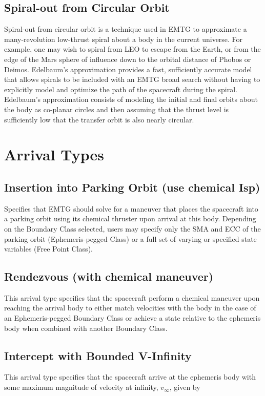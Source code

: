     \subsection{Spiral-out from Circular Orbit}
    \label{sec:spiral_out}
    Spiral-out from circular orbit is a technique used in \ac{EMTG} to approximate a many-revolution low-thrust spiral about a body in the current universe. For example, one may wish to spiral from \ac{LEO} to escape from the Earth, or from the edge of the Mars sphere of influence down to the orbital distance of Phobos or Deimos. Edelbaum's approximation provides a fast, sufficiently accurate model that allows spirals to be included with an \ac{EMTG} broad search without having to explicitly model and optimize the path of the spacecraft during the spiral. Edelbaum's approximation consists of modeling the initial and final orbits about the body as co-planar circles and then assuming that the thrust level is sufficiently low that the transfer orbit is also nearly circular.


\section{Arrival Types}
\label{sec:arrival_boundaries}

    \subsection{Insertion into Parking Orbit (use chemical Isp)}
    \label{sec:insert_parking_orbit} 
    Specifies that \ac{EMTG} should solve for a maneuver that places the spacecraft into a parking orbit using its chemical thruster upon arrival at this body. Depending on the Boundary Class selected, users may specify only the \ac{SMA} and \ac{ECC} of the parking orbit (Ephemeris-pegged Class) or a full set of varying or specified state variables (Free Point Class). 

    \subsection{Rendezvous (with chemical maneuver)}
    \label{sec:rendezvous_arrival}
    This arrival type specifies that the spacecraft perform a chemical maneuver upon reaching the arrival body to either match velocities with the body in the case of an Ephemeris-pegged Boundary Class or achieve a state relative to the ephemeris body when combined with another Boundary Class.

    \subsection{Intercept with Bounded V-Infinity}
    \label{sec:intercept_bounded_vinfty}
    This arrival type specifies that the spacecraft arrive at the ephemeris body with some maximum magnitude of velocity at infinity, $v_{\infty}$, given by 

